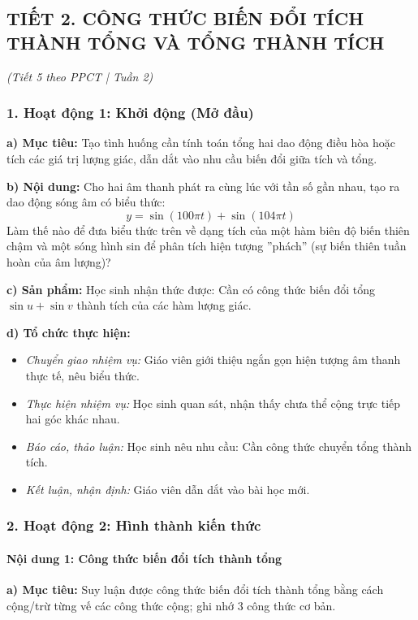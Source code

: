 \documentclass[12pt, a4paper]{article}
\begin{document}
\vspace{10pt}
\subsection*{TIẾT 2. CÔNG THỨC BIẾN ĐỔI TÍCH THÀNH TỔNG VÀ TỔNG THÀNH TÍCH}
\textit{(Tiết 5 theo PPCT | Tuần 2)}

\subsubsection*{1. Hoạt động 1: Khởi động (Mở đầu)}
\textbf{a) Mục tiêu:} Tạo tình huống cần tính toán tổng hai dao động điều hòa hoặc tích các giá trị lượng giác, dẫn dắt vào nhu cầu biến đổi giữa tích và tổng.

\textbf{b) Nội dung:}
Cho hai âm thanh phát ra cùng lúc với tần số gần nhau, tạo ra dao động sóng âm có biểu thức:
$$y = \sin(100\pi t) + \sin(104\pi t)$$
Làm thế nào để đưa biểu thức trên về dạng tích của một hàm biên độ biến thiên chậm và một sóng hình sin để phân tích hiện tượng ''phách'' (sự biến thiên tuần hoàn của âm lượng)?

\textbf{c) Sản phẩm:} Học sinh nhận thức được: Cần có công thức biến đổi tổng $\sin u + \sin v$ thành tích của các hàm lượng giác.

\textbf{d) Tổ chức thực hiện:}
\begin{itemize}[leftmargin=0.6cm]
    \item \textit{Chuyển giao nhiệm vụ:} Giáo viên giới thiệu ngắn gọn hiện tượng âm thanh thực tế, nêu biểu thức.
    \item \textit{Thực hiện nhiệm vụ:} Học sinh quan sát, nhận thấy chưa thể cộng trực tiếp hai góc khác nhau.
    \item \textit{Báo cáo, thảo luận:} Học sinh nêu nhu cầu: Cần công thức chuyển tổng thành tích.
    \item \textit{Kết luận, nhận định:} Giáo viên dẫn dắt vào bài học mới.
\end{itemize}

\subsubsection*{2. Hoạt động 2: Hình thành kiến thức}

\paragraph{Nội dung 1: Công thức biến đổi tích thành tổng}
\textbf{a) Mục tiêu:} Suy luận được công thức biến đổi tích thành tổng bằng cách cộng/trừ từng vế các công thức cộng; ghi nhớ 3 công thức cơ bản.
\end{document}
